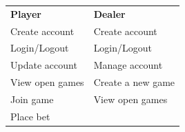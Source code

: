 \begin{center}
{\def\LTcaptype{none} %
\begin{longtable}[]{@{}
>{\raggedright\arraybackslash} p{}
>{\raggedright\arraybackslash} p{}@{}}
\toprule\noalign{}
\endhead
\bottomrule\noalign{}
\endlastfoot
\begin{minipage}[t]{\linewidth}\raggedright
\textbf{Player}
\end{minipage} & \begin{minipage}[t]{\linewidth}\raggedright
\textbf{Dealer}
\end{minipage} \\
\begin{minipage}[t]{\linewidth}\raggedright
Create account
\end{minipage} & \begin{minipage}[t]{\linewidth}\raggedright
Create account
\end{minipage} \\
\begin{minipage}[t]{\linewidth}\raggedright
Login/Logout
\end{minipage} & \begin{minipage}[t]{\linewidth}\raggedright
Login/Logout
\end{minipage} \\
\begin{minipage}[t]{\linewidth}\raggedright
Update account
\end{minipage} & \begin{minipage}[t]{\linewidth}\raggedright
Manage account
\end{minipage} \\
\begin{minipage}[t]{\linewidth}\raggedright
View open games
\end{minipage} & \begin{minipage}[t]{\linewidth}\raggedright
Create a new game
\end{minipage} \\
\begin{minipage}[t]{\linewidth}\raggedright
Join game
\end{minipage} & \begin{minipage}[t]{\linewidth}\raggedright
View open games
\end{minipage} \\
\begin{minipage}[t]{\linewidth}\raggedright
Place bet
\end{minipage} & \begin{minipage}[t]{\linewidth}\raggedright

\end{minipage}
\end{longtable}}
\end{center}
